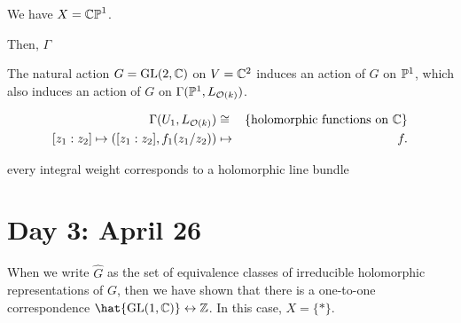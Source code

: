 \documentclass{../../small}
\begin{document}
\begin{ex}[$n=2$]
We have $X=\CP^1$.

Then, $\Gamma$

The natural action $G=\GL(2,\C)$ on $V=\C^2$ induces an action of $G$ on $\P^1$, which also induces an action of $G$ on $\Gamma(\P^1,L_{\cO(k)})$.


\end{ex}

\begin{align*}
\Gamma(U_1,L_{\cO(k)})&\cong&\{\text{holomorphic functions on $\C$}\}\\
[z_1:z_2]\mapsto([z_1:z_2],f_1(z_1/z_2))&\mapsto&f.
\end{align*}


every integral weight corresponds to a holomorphic line bundle

\newpage
\section{Day 3: April 26}

When we write $\hat G$ as the set of equivalence classes of irreducible holomorphic representations of $G$, then we have shown that there is a one-to-one correspondence $\hat{\GL(1,\C)}\leftrightarrow\Z$.
In this case, $X=\{*\}$.
\end{document}
